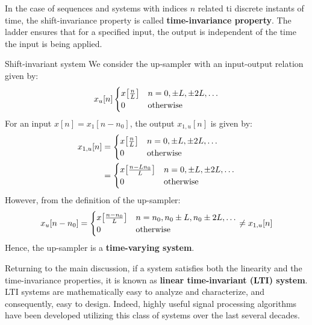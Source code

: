 \documentclass[../../main/main.tex]{subfiles}
\begin{document}
In the case of sequences and systems with indices \( n \) related ti discrete instants of time, the shift-invariance property is called \textbf{time-invariance property}. The ladder ensures that for a specified input, the output is independent of the time the input is being applied.

\begin{example}{Shift-invariant system}{}
    We consider the up-sampler with an input-output relation given by:
    \begin{equation}
        x_{u}[n]
        \begin{cases}
            x\qty[\frac{n}{L}]  &   n = 0, \pm L, \pm 2L, \dots \\
            0                   &   \text{otherwise}
        \end{cases}
        \label{eq:L03_S33_1}
    \end{equation}
    For an input \( x[n] = x_{1}[n-n_{0}] \), the output \( x_{1,u}[n] \) is given by:
    \begin{align}
        x_{1,u}[n]
        &=
            \begin{cases}
                x\qty[\frac{n}{L}]  &   n = 0, \pm L, \pm 2L, \dots \\
                0                   &   \text{otherwise}
            \end{cases}
            \nonumber   \\
        &=
            \begin{cases}
                x\qty[\frac{n-Ln_{0}}{L}]   &   n = 0, \pm L, \pm 2L, \dots     \\
                0                           &   \text{otherwise}
            \end{cases}
    \end{align}
    However, from the definition of the up-sampler:
    \begin{equation}
        x_{u}[n-n_{0}]
        =
        \begin{cases}
            x\qty[\frac{n-n_{0}}{L}]    &   n = n_{0}, n_{0} \pm L, n_{0} \pm 2L, \dots    \\
            0                           &   \text{otherwise}
        \end{cases}
        \neq
        x_{1,u}[n]
        \label{eq:L03_S34_1}
    \end{equation}
    Hence, the up-sampler is a \textbf{time-varying system}.
\end{example}


\medskip
{}
Returning to the main discussion, if a system satisfies both the linearity and the time-invariance properties, it is known as \textbf{linear time-invariant (LTI) system}. LTI systems are mathematically easy to analyze and characterize, and consequently, easy to design. Indeed, highly useful signal processing algorithms have been developed utilizing this class of systems over the last several decades.
\end{document}
